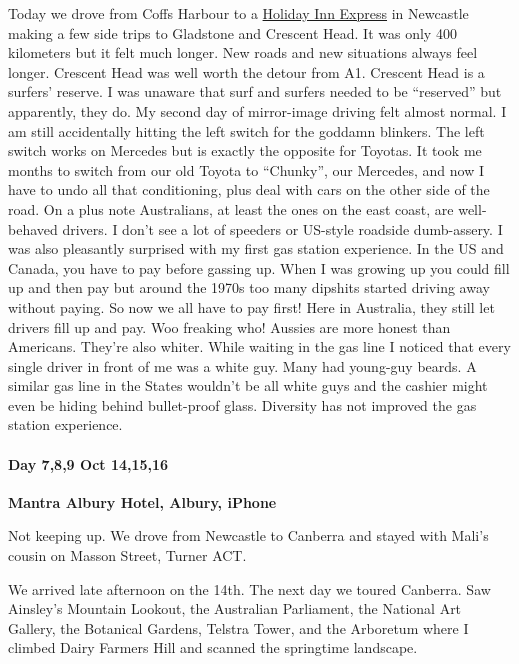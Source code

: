 Today we drove from Coffs Harbour to a
\href{https://www.ihg.com/holidayinnexpress/hotels/us/en/newcastle/ntlnc/hoteldetail}{Holiday
Inn Express} in Newcastle making a few side trips to Gladstone and
Crescent Head. It was only 400 kilometers but it felt much longer. New
roads and new situations always feel longer. Crescent Head was well
worth the detour from A1. Crescent Head is a surfers' reserve. I was
unaware that surf and surfers needed to be ``reserved'' but apparently,
they do. My second day of mirror-image driving felt almost normal. I am
still accidentally hitting the left switch for the goddamn blinkers. The
left switch works on Mercedes but is exactly the opposite for Toyotas.
It took me months to switch from our old Toyota to ``Chunky'', our
Mercedes, and now I have to undo all that conditioning, plus deal with
cars on the other side of the road. On a plus note Australians, at least
the ones on the east coast, are well-behaved drivers. I don't see a lot
of speeders or US-style roadside dumb-assery. I was also pleasantly
surprised with my first gas station experience. In the US and Canada,
you have to pay before gassing up. When I was growing up you could fill
up and then pay but around the 1970s too many dipshits started driving
away without paying. So now we all have to pay first! Here in Australia,
they still let drivers fill up and pay. Woo freaking who! Aussies are
more honest than Americans. They're also whiter. While waiting in the
gas line I noticed that every single driver in front of me was a white
guy. Many had young-guy beards. A similar gas line in the States
wouldn't be all white guys and the cashier might even be hiding behind
bullet-proof glass. Diversity has not improved the gas station
experience.

\hypertarget{day-789-oct-141516}{%
\paragraph{\texorpdfstring{\textbf{Day 7,8,9 Oct
14,15,16}}{Day 7,8,9 Oct 14,15,16}}\label{day-789-oct-141516}}

\textbf{Mantra Albury Hotel, Albury, iPhone}

Not keeping up. We drove from Newcastle to Canberra and stayed with
Mali's cousin on Masson Street, Turner ACT.

We arrived late afternoon on the 14th. The next day we toured Canberra.
Saw Ainsley's Mountain Lookout, the Australian Parliament, the National
Art Gallery, the Botanical Gardens, Telstra Tower, and the Arboretum
where I climbed Dairy Farmers Hill and scanned the springtime landscape.

